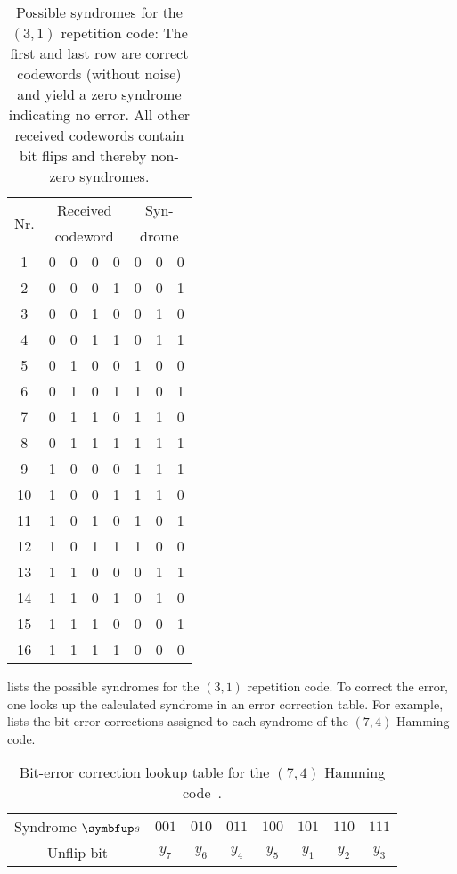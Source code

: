 \begin{table}[htb]
	\centering
	\begin{tabular}{c|cccc|ccc}
		\toprule
		\multirow{2}{*}{Nr.} & \multicolumn{4}{c}{Received} & \multicolumn{3}{c}{Syn-} \\
		& \multicolumn{4}{c}{codeword} & \multicolumn{3}{c}{drome} \\
		\midrule
			1 & 0 & 0 & 0 & 0 & 0 & 0 & 0 \\
			2 & 0 & 0 & 0 & 1 & 0 & 0 & 1 \\
			3 & 0 & 0 & 1 & 0 & 0 & 1 & 0 \\
			4 & 0 & 0 & 1 & 1 & 0 & 1 & 1 \\
			5 & 0 & 1 & 0 & 0 & 1 & 0 & 0 \\
			6 & 0 & 1 & 0 & 1 & 1 & 0 & 1 \\
			7 & 0 & 1 & 1 & 0 & 1 & 1 & 0 \\
			8 & 0 & 1 & 1 & 1 & 1 & 1 & 1 \\
			9 & 1 & 0 & 0 & 0 & 1 & 1 & 1 \\
			10 & 1 & 0 & 0 & 1 & 1 & 1 & 0 \\
			11 & 1 & 0 & 1 & 0 & 1 & 0 & 1 \\
			12 & 1 & 0 & 1 & 1 & 1 & 0 & 0 \\
			13 & 1 & 1 & 0 & 0 & 0 & 1 & 1 \\
			14 & 1 & 1 & 0 & 1 & 0 & 1 & 0 \\
			15 & 1 & 1 & 1 & 0 & 0 & 0 & 1 \\
			16 & 1 & 1 & 1 & 1 & 0 & 0 & 0 \\
		\bottomrule
	\end{tabular}
	\caption{Possible syndromes for the $(3,1)$ repetition code: The first and last row are correct codewords (without noise) and yield a zero syndrome indicating no error. All other received codewords contain bit flips and thereby non-zero syndromes.}\label{tab:repetition_syndromes}
\end{table}
 lists the possible syndromes for the $(3,1)$ repetition code.
To correct the error, one looks up the calculated syndrome in an error correction table.
For example,  lists the bit-error corrections assigned to each syndrome of the $(7,4)$ Hamming code.
\begin{table}[htb]
	\centering
	\begin{tabular}{cccccccc}
		\toprule
		Syndrome $\vb{s}$ & $001$ & $010$ & $011$ & $100$ & $101$ & $110$ & $111$ \\
		Unflip bit & $y_7$ & $y_6$ & $y_4$ & $y_5$ & $y_1$ & $y_2$ & $y_3$ \\
		\bottomrule
	\end{tabular}
	\caption{Bit-error correction lookup table for the $(7,4)$ Hamming code~\cite[p.~11]{MacKay2003}.}\label{tab:hamming_correction}
\end{table}

